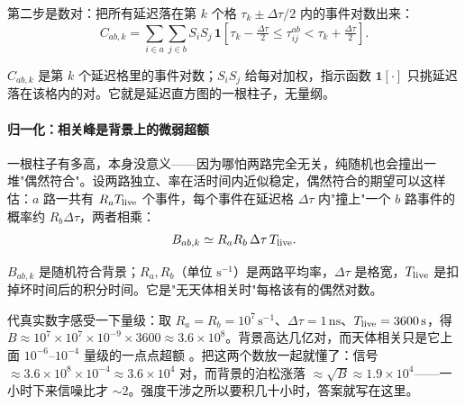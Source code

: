 第二步是数对：把所有延迟落在第 \(k\) 个格 \(\tau_k\pm\Delta\tau/2\) 内的事件对数出来：
\begin{equation}
  C_{ab,k}
  =\sum_{i\in a}\sum_{j\in b}
  S_iS_j\,
  \mathbf 1\!\left[\tau_k-\tfrac{\Delta\tau}{2}\le\tau_{ij}^{ab}<\tau_k+\tfrac{\Delta\tau}{2}\right] .
  \label{eq:e14-paircount}
\end{equation}
\begin{formulaexplain}
\(C_{ab,k}\) 是第 \(k\) 个延迟格里的事件对数；\(S_iS_j\) 给每对加权，指示函数 \(\mathbf 1[\cdot]\) 只挑延迟落在该格内的对。它就是延迟直方图的一根柱子，无量纲。
\end{formulaexplain}

\paragraph{归一化：相关峰是背景上的微弱超额}

一根柱子有多高，本身没意义——因为哪怕两路完全无关，纯随机也会撞出一堆"偶然符合"。设两路独立、率在活时间内近似稳定，偶然符合的期望可以这样估：\(a\) 路一共有 \(R_aT_{\rm live}\) 个事件，每个事件在延迟格 \(\Delta\tau\) 内"撞上"一个 \(b\) 路事件的概率约 \(R_b\Delta\tau\)，两者相乘：
\begin{equation}
  B_{ab,k}\simeq R_aR_b\,\Delta\tau\,T_{\rm live} .
  \label{eq:e14-accidental}
\end{equation}
\begin{formulaexplain}
\(B_{ab,k}\) 是随机符合背景；\(R_a,R_b\)（单位 \(\mathrm{s^{-1}}\)）是两路平均率，\(\Delta\tau\) 是格宽，\(T_{\rm live}\) 是扣掉坏时间后的积分时间。它是"无天体相关时"每格该有的偶然对数。
\end{formulaexplain}
代真实数字感受一下量级：取 \(R_a=R_b=10^{7}\,\mathrm{s^{-1}}\)、\(\Delta\tau=1\,\mathrm{ns}\)、\(T_{\rm live}=3600\,\mathrm{s}\)，得 \(B\approx10^{7}\times10^{7}\times10^{-9}\times3600\approx3.6\times10^{8}\)。背景高达几亿对，而天体相关只是它上面 \(10^{-6}\)–\(10^{-4}\) 量级的一点点超额 \citep{1974iiia.book.....H,2020NatAs...4.1164A,2024MNRAS.529.4387A}。把这两个数放一起就懂了：信号 \(\approx3.6\times10^{8}\times10^{-4}\approx3.6\times10^{4}\) 对，而背景的泊松涨落 \(\approx\sqrt{B}\approx1.9\times10^{4}\)——一小时下来信噪比才 \(\sim2\)。强度干涉之所以要积几十小时，答案就写在这里。

